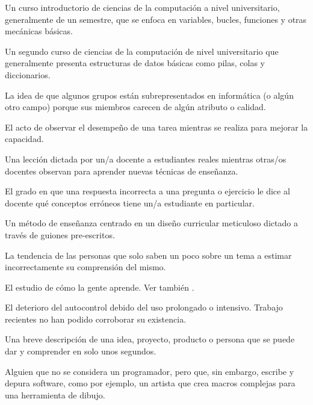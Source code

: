 \begin{description}
 Un curso introductorio de ciencias de la computación a nivel universitario, 
generalmente de un semestre, que se enfoca en variables, bucles, funciones y otras mecánicas básicas.

 Un segundo curso de ciencias de la computación de nivel universitario 
que generalmente presenta estructuras de datos básicas como pilas, colas y diccionarios.

 La idea de que algunos grupos 
están subrepresentados en informática (o algún otro campo) porque sus miembros 
carecen de algún atributo o calidad.

 El acto de observar el desempeño 
de una tarea mientras se realiza para mejorar la capacidad.

 Una lección dictada por un/a docente a estudiantes reales 
mientras otras/os docentes observan para aprender nuevas técnicas de enseñanza.

 El grado en que una respuesta incorrecta 
a una pregunta o ejercicio le dice al docente qué conceptos erróneos tiene un/a estudiante en particular.

 Un método de enseñanza centrado 
en un diseño curricular meticuloso dictado a través de guiones pre-escritos.

 La tendencia de las personas que solo saben 
un poco sobre un tema a estimar incorrectamente su comprensión del mismo.

 El estudio de cómo
la gente aprende. Ver también .

 El deterioro del autocontrol debido del uso prolongado o intensivo. 
Trabajo recientes no han podido corroborar su existencia.

 Una breve descripción de una idea, 
proyecto, producto o persona que se puede dar y comprender en solo unos segundos.

 Alguien que no se considera 
un programador, pero que, sin embargo, escribe y depura software, como por ejemplo, un artista que 
crea macros complejas para una herramienta de dibujo.


\end{description}
